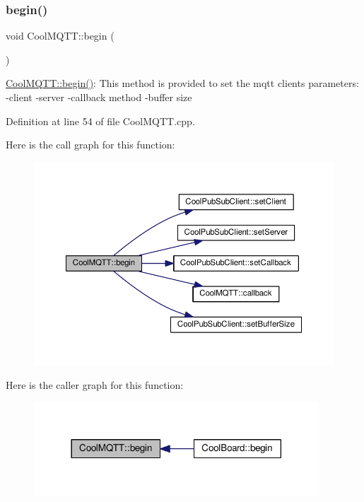 \subsubsection{\texorpdfstring{begin()}{begin()}}
{\footnotesize\ttfamily void Cool\+M\+Q\+T\+T\+::begin (\begin{DoxyParamCaption}{ }\end{DoxyParamCaption})}

\hyperlink{class_cool_m_q_t_t_ac9248808641ebf3054ed0620ea9d0100}{Cool\+M\+Q\+T\+T\+::begin()}\+: This method is provided to set the mqtt client\textquotesingle{}s parameters\+: -\/client -\/server -\/callback method -\/buffer size 

Definition at line 54 of file Cool\+M\+Q\+T\+T.\+cpp.

Here is the call graph for this function\+:
\nopagebreak
\begin{figure}[H]
\begin{center}
\leavevmode
\includegraphics[width=350pt]{class_cool_m_q_t_t_ac9248808641ebf3054ed0620ea9d0100_cgraph}
\end{center}
\end{figure}
Here is the caller graph for this function\+:
\nopagebreak
\begin{figure}[H]
\begin{center}
\leavevmode
\includegraphics[width=302pt]{class_cool_m_q_t_t_ac9248808641ebf3054ed0620ea9d0100_icgraph}
\end{center}
\end{figure}
\mbox{\label{class_cool_m_q_t_t_a30d82ad665bfb603f46ecdbc290775df}} 
